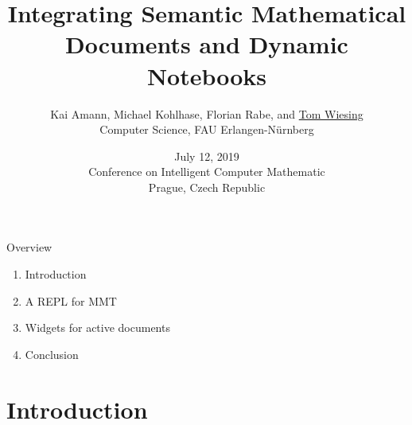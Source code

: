 \documentclass{beamer}
\title[Semantic Documents and Dynamic Notebooks]{Integrating Semantic Mathematical Documents and Dynamic Notebooks}
\author[Tom Wiesing et al.]{Kai Amann, Michael Kohlhase, Florian Rabe, and \underline{Tom Wiesing}\\Computer Science, FAU Erlangen-N{\"u}rnberg}
\date[July 12 2019, CICM Prague]{July 12, 2019\\Conference on Intelligent Computer Mathematic\\Prague, Czech Republic}
\begin{document}
    \frame{\titlepage}

    \begin{frame}{Overview}
        \begin{enumerate}
            \item Introduction
            \item A REPL for MMT
            \item Widgets for active documents
            \item Conclusion
        \end{enumerate}
    \end{frame}

    \section{Introduction}
\end{document}
